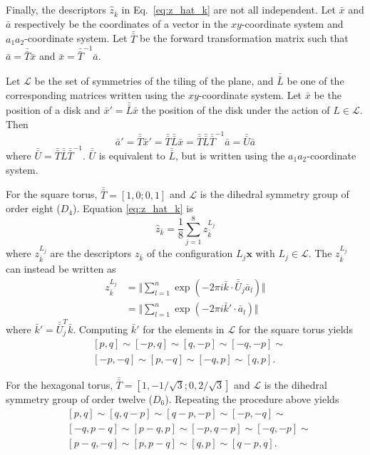 \documentclass[default,iicol]{sn-jnl}%
\theoremstyle{thmstyleone}%
\theoremstyle{thmstyletwo}%
\theoremstyle{thmstylethree}%
\renewcommand{\vec}[1]{\bar{#1}}
\providecommand{\mat}[1]{\bar{\bar{#1}}}
\providecommand{\config}[1]{\mathbf{#1}}
\providecommand{\rmi}{i}
\begin{document}
\begin{appendices}
	

	
	Finally, the descriptors $\hat{z}_{\vec{k}}$ in Eq.\ \ref{eq:z_hat_k} are not all independent. Let $\vec{x}$ and $\vec{a}$ respectively be the coordinates of a vector in the $xy$-coordinate system and $a_1a_2$-coordinate system. Let $\mat{T}$ be the forward transformation matrix such that $\vec{a} = \mat{T} \vec{x}$ and $\vec{x} = \mat{T}^{-1} \vec{a}$. 
	
	Let $\mathcal{L}$ be the set of symmetries of the tiling of the plane, and $\mat{L}$ be one of the corresponding matrices written using the $xy$-coordinate system. Let $\vec{x}$ be the position of a disk and $\vec{x}' = \mat{L} \vec{x}$ the position of the disk under the action of $L \in \mathcal{L}$. Then
	\begin{equation*} 
	\vec{a}' = \mat{T} \vec{x}' = \mat{T} \mat{L} \vec{x} = \mat{T} \mat{L} \mat{T}^{-1} \vec{a} = \mat{U} \vec{a}  
	\end{equation*}
	where $\mat{U} = \mat{T} \mat{L} \mat{T}^{-1}$. $\mat{U}$ is equivalent to $\mat{L}$, but is written using the $a_1a_2$-coordinate system.
	
	For the square torus, $\mat{T} = [1, 0; 0, 1]$ and $\mathcal{L}$ is the dihedral symmetry group of order eight ($D_4$). Equation \ref{eq:z_hat_k} is
	\begin{equation*}
	\hat{z}_{\vec{k}} = \frac{1}{8} \sum_{j = 1}^{8} z_{\vec{k}}^{L_j}
	\end{equation*}
	where $z_{\vec{k}}^{L_j}$ are the descriptors $z_{\vec{k}}$ of the configuration $L_j \config{x}$ with $L_j \in \mathcal{L}$. The $z_{\vec{k}}^{L_j}$ can instead be written as
	\begin{align*} 
	z_{\vec{k}}^{L_j} &= \bigg\Vert \sum_{l = 1}^{n} \exp{(-2\pi \rmi 
		\vec{k} \cdot \mat{U}_j \vec{a}_l)} \bigg\Vert \nonumber \\
		&= \bigg\Vert \sum_{l = 1}^{n} \exp{(-2\pi \rmi 
		\vec{k}' \cdot \vec{a}_l)} \bigg\Vert
	\end{align*}
	where $\vec{k}' = \mat{U}_j^T \vec{k}$. Computing $\vec{k}'$ for the elements in $\mathcal{L}$ for the square torus yields
	\begin{align*}
		& [p,q] \sim [-p,q] \sim [q,-p] \sim [-q,-p ] \sim \nonumber \\
		& [-p,-q]  \sim [p,-q] \sim [-q,p] \sim [q,p].
	\end{align*}
	
	For the hexagonal torus, $\mat{T} = [1, -1/\sqrt{3}; 0, 2 / \sqrt{3}]$ and $\mathcal{L}$ is the dihedral symmetry group of order twelve ($D_6$). Repeating the procedure above yields
	\begin{align*}
		& [p,q] \sim [q,q-p] \sim [q-p,-p] \sim [-p,-q] \sim \nonumber \\
		& [-q,p-q] \sim [p-q,p] \sim [-p,q-p] \sim [-q,-p] \sim \nonumber \\
		& [p-q,-q] \sim [p,p-q] \sim [q,p] \sim [q-p,q].
	\end{align*}

\end{appendices}
\end{document}
